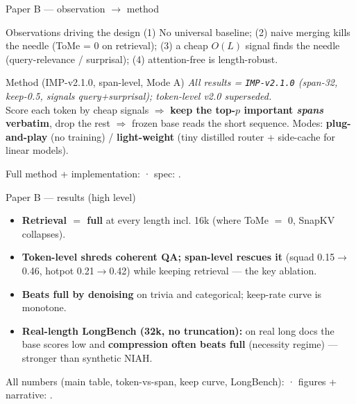 \begin{frame}{Paper B --- observation $\rightarrow$ method}
  \small
  \begin{block}{Observations driving the design}
    (1) No universal baseline; (2) naive merging kills the needle (ToMe = 0 on retrieval); (3) a cheap $O(L)$ signal finds the needle (query-relevance / surprisal); (4) attention-free is length-robust.
  \end{block}
  \begin{block}{Method (IMP-v2.1.0, span-level, Mode A)}
    \scriptsize\emph{All results = \texttt{IMP-v2.1.0} (span-32, keep-0.5, signals query+surprisal); token-level v2.0 superseded.}\\[2pt]
    Score each token by cheap signals $\Rightarrow$ \textbf{keep the top-$p$ important \emph{spans} verbatim}, drop the rest $\Rightarrow$ frozen base reads the short sequence. Modes: \textbf{plug-and-play} (no training) / \textbf{light-weight} (tiny distilled router + side-cache for linear models).
  \end{block}
  \scriptsize Full method + implementation:  · spec: .
\end{frame}

\begin{frame}{Paper B --- results (high level)}
  \small
  \begin{itemize}
    \item \textbf{Retrieval $=$ full} at every length incl. 16k (where ToMe $=$ 0, SnapKV collapses).
    \item \textbf{Token-level shreds coherent QA; span-level rescues it} (squad 0.15$\to$0.46, hotpot 0.21$\to$0.42) while keeping retrieval — the key ablation.
    \item \textbf{Beats full by denoising} on trivia and categorical; keep-rate curve is monotone.
    \item \textbf{Real-length LongBench (32k, no truncation):} on real long docs the base scores low and \textbf{compression often beats full} (necessity regime) — stronger than synthetic NIAH.
  \end{itemize}
  \scriptsize All numbers (main table, token-vs-span, keep curve, LongBench):  · figures + narrative: .
\end{frame}

